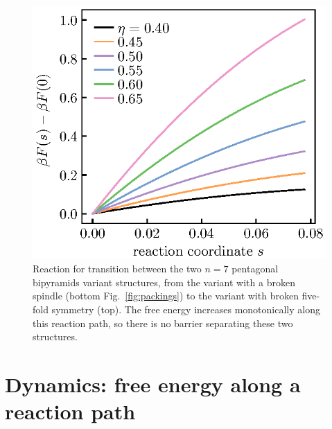 \documentclass[11pt,twoside]{report}
\begin{document}
\begin{figure}
  \includegraphics[width=0.9\linewidth,outer]{n7-reaction-path}
  \caption[Reaction path for the two variants of the frustrated pentagonal bipyramid]{
    Reaction for transition between the two $n = 7$ pentagonal bipyramids variant structures, from the variant with a broken spindle (bottom Fig.\ \ref{fig:packings}) to the variant with broken five-fold symmetry (top).
    The free energy increases monotonically along this reaction path, so there is no barrier separating these two structures.
  }
  \label{fig:reaction-path-7}
\end{figure}

\section{Dynamics: free energy along a reaction path}
\end{document}
